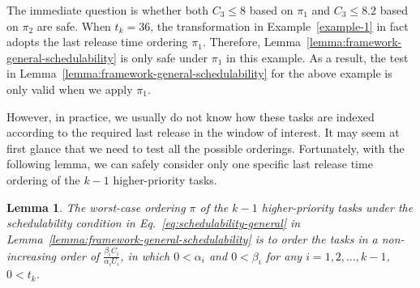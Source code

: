 \documentclass[10pt,conference]{IEEEtran}
\newtheorem{lemma}{Lemma}
\begin{document}
The immediate question is whether both  $C_3 \leq 8$ based on
$\pi_1$ and $C_3 \leq 8.2$ based on $\pi_2$ are safe. When $t_k=36$,
the transformation in Example~\ref{example-1} in fact adopts the last
release time ordering $\pi_1$. Therefore,
Lemma~\ref{lemma:framework-general-schedulability} is only safe under
$\pi_1$ in this example. As a result, the test in
Lemma~\ref{lemma:framework-general-schedulability} for the above
example is only valid when we apply $\pi_1$.

However, in practice, we usually do not know how these tasks are indexed according to the required last release in the window of interest. It may seem at first glance that we need to test all the possible orderings. Fortunately, with the following lemma, we can safely consider only one specific last release time ordering of the $k-1$ higher-priority tasks. 
\begin{lemma}
  \label{lemma:general-sorting}
  The worst-case ordering $\pi$ of the $k-1$ higher-priority tasks under the schedulability condition in Eq.~\eqref{eq:schedulability-general} in Lemma~\ref{lemma:framework-general-schedulability} is to order the tasks in a non-increasing order of $\frac{\beta_i C_i}{\alpha_i U_i}$,
 in which $0 < \alpha_i$ and $0 < \beta_i$ for any $i=1,2,\ldots,k-1$, $0 < t_k$.
\end{lemma}
\end{document}
